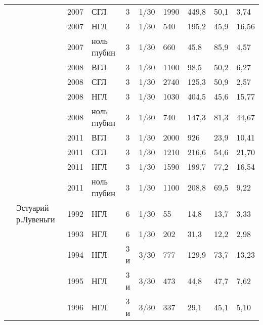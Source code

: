 \begin{footnotesize}
\begin{center}
\begin{longtable}{|p{1.6cm}|p{2.3cm}|p{0.8cm}|p{1.8cm}|p{1.1cm}|p{1.1cm}|*{4}{p{1cm}|}}
                   &                                & 2007 & СГЛ               & 3    & 1/30 & 1990 & 449,8  & 50,1  & 3,74  \\
                   &                                & 2007 & НГЛ               & 3    & 1/30 & 540  & 195,2  & 45,9  & 16,56 \\
                   &                                & 2007 & ноль глубин       & 3    & 1/30 & 660  & 45,8   & 85,9  & 4,57  \\
                   &                                & 2008 & ВГЛ               & 3    & 1/30 & 1100 & 98,5   & 50,2  & 6,27  \\
                   &                                & 2008 & СГЛ               & 3    & 1/30 & 2740 & 125,3  & 50,9  & 2,57  \\
                   &                                & 2008 & НГЛ               & 3    & 1/30 & 1030 & 404,5  & 45,6  & 15,77 \\
                   &                                & 2008 & ноль глубин       & 3    & 1/30 & 740  & 147,3  & 81,3  & 44,67 \\
                   &                                & 2011 & ВГЛ               & 3    & 1/30 & 2000 & 926    & 23,9  & 10,41 \\
                   &                                & 2011 & СГЛ               & 3    & 1/30 & 1210 & 216,6  & 54,6  & 21,70 \\
                   &                                & 2011 & НГЛ               & 3    & 1/30 & 1590 & 199,7  & 77,2  & 16,54 \\
                   &                                & 2011 & ноль глубин       & 3    & 1/30 & 1100 & 208,8  & 69,5  & 9,22  \\\cline{2-10}
                   & Эстуарий р.Лувеньги            & 1992 & НГЛ               & 6    & 1/30 & 55   & 14,8   & 13,7  & 3,33  \\
                   &                                & 1993 & НГЛ               & 6    & 1/30 & 202  & 31,3   & 12,2  & 2,98  \\
                   &                                & 1994 & НГЛ               & 3 и  & 3/30 & 777  & 129,9  & 73,7  & 13,23 \\
                   &                                & 1995 & НГЛ               & 3 и  & 3/30 & 473  & 44,8   & 47,7  & 7,62  \\
                   &                                & 1996 & НГЛ               & 3 и  & 3/30 & 337  & 29,1   & 45,1  & 5,10  \\

\end{longtable}
\end{center}
\end{footnotesize}
